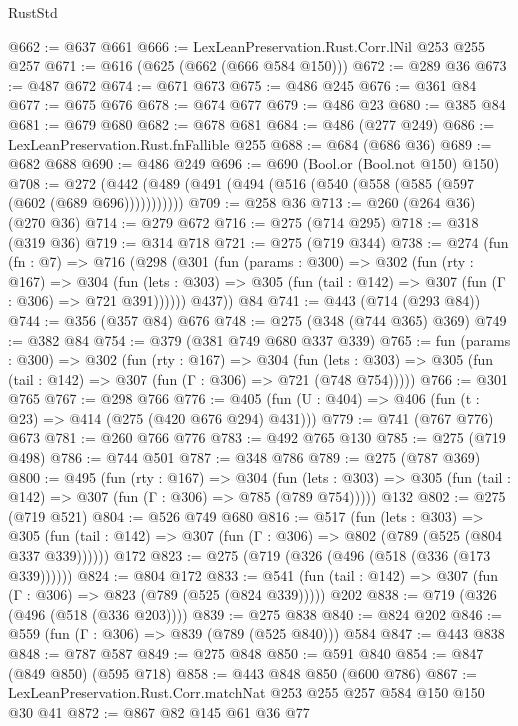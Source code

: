 \begin{lexlean}{RustStd}
\begin{coremodule}
@662 := @637 @661
@666 := LexLeanPreservation.Rust.Corr.lNil @253 @255 @257
@671 := @616 (@625 (@662 (@666 @584 @150)))
@672 := @289 @36
@673 := @487 @672
@674 := @671 @673
@675 := @486 @245
@676 := @361 @84
@677 := @675 @676
@678 := @674 @677
@679 := @486 @23
@680 := @385 @84
@681 := @679 @680
@682 := @678 @681
@684 := @486 (@277 @249)
@686 := LexLeanPreservation.Rust.fnFallible @255
@688 := @684 (@686 @36)
@689 := @682 @688
@690 := @486 @249
@696 := @690 (Bool.or (Bool.not @150) @150)
@708 := @272 (@442 (@489 (@491 (@494 (@516 (@540 (@558 (@585 (@597 (@602 (@689 @696)))))))))))
@709 := @258 @36
@713 := @260 (@264 @36) (@270 @36)
@714 := @279 @672
@716 := @275 (@714 @295)
@718 := @318 (@319 @36)
@719 := @314 @718
@721 := @275 (@719 @344)
@738 := @274
    (fun (fn : @7) =>
    @716
      (@298
        (@301
          (fun (params : @300) =>
          @302
            (fun (rty : @167) =>
            @304
              (fun (lets : @303) =>
              @305 (fun (tail : @142) => @307 (fun (Γ : @306) => @721 @391))))))
        @437))
    @84
@741 := @443 (@714 (@293 @84))
@744 := @356 (@357 @84) @676
@748 := @275 (@348 (@744 @365) @369)
@749 := @382 @84
@754 := @379 (@381 @749 @680 @337 @339)
@765 := fun (params : @300) =>
  @302
    (fun (rty : @167) =>
    @304
      (fun (lets : @303) => @305 (fun (tail : @142) => @307 (fun (Γ : @306) => @721 (@748 @754)))))
@766 := @301 @765
@767 := @298 @766
@776 := @405 (fun (U : @404) => @406 (fun (t : @23) => @414 (@275 (@420 @676 @294) @431)))
@779 := @741 (@767 @776) @673
@781 := @260 @766 @776
@783 := @492 @765 @130
@785 := @275 (@719 @498)
@786 := @744 @501
@787 := @348 @786
@789 := @275 (@787 @369)
@800 := @495
    (fun (rty : @167) =>
    @304
      (fun (lets : @303) => @305 (fun (tail : @142) => @307 (fun (Γ : @306) => @785 (@789 @754)))))
    @132
@802 := @275 (@719 @521)
@804 := @526 @749 @680
@816 := @517
    (fun (lets : @303) =>
    @305 (fun (tail : @142) => @307 (fun (Γ : @306) => @802 (@789 (@525 (@804 @337 @339))))))
    @172
@823 := @275 (@719 (@326 (@496 (@518 (@336 (@173 @339))))))
@824 := @804 @172
@833 := @541 (fun (tail : @142) => @307 (fun (Γ : @306) => @823 (@789 (@525 (@824 @339))))) @202
@838 := @719 (@326 (@496 (@518 (@336 @203))))
@839 := @275 @838
@840 := @824 @202
@846 := @559 (fun (Γ : @306) => @839 (@789 (@525 @840))) @584
@847 := @443 @838
@848 := @787 @587
@849 := @275 @848
@850 := @591 @840
@854 := @847 (@849 @850) (@595 @718)
@858 := @443 @848 @850 (@600 @786)
@867 := LexLeanPreservation.Rust.Corr.matchNat @253 @255 @257 @584 @150 @150 @30 @41
@872 := @867 @82 @145 @61 @36 @77

\end{coremodule}
\end{lexlean}
